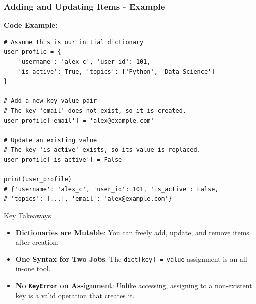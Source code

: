 \documentclass{beamer}
\begin{document}
\begin{frame}[fragile]
    \frametitle{Adding and Updating Items - Example}

    \textbf{Code Example:}
    \begin{verbatim}
# Assume this is our initial dictionary
user_profile = {
    'username': 'alex_c', 'user_id': 101, 
    'is_active': True, 'topics': ['Python', 'Data Science']
}

# Add a new key-value pair
# The key 'email' does not exist, so it is created.
user_profile['email'] = 'alex@example.com'

# Update an existing value
# The key 'is_active' exists, so its value is replaced.
user_profile['is_active'] = False

print(user_profile)
# {'username': 'alex_c', 'user_id': 101, 'is_active': False, 
# 'topics': [...], 'email': 'alex@example.com'}
    \end{verbatim}
    
    \begin{block}{Key Takeaways}
        \begin{itemize}
            \item \textbf{Dictionaries are Mutable}: You can freely add, update, and remove items after creation.
            \item \textbf{One Syntax for Two Jobs}: The \texttt{dict[key] = value} assignment is an all-in-one tool.
            \item \textbf{No \texttt{KeyError} on Assignment}: Unlike accessing, assigning to a non-existent key is a valid operation that creates it.
        \end{itemize}
    \end{block}

\end{frame}
\end{document}
